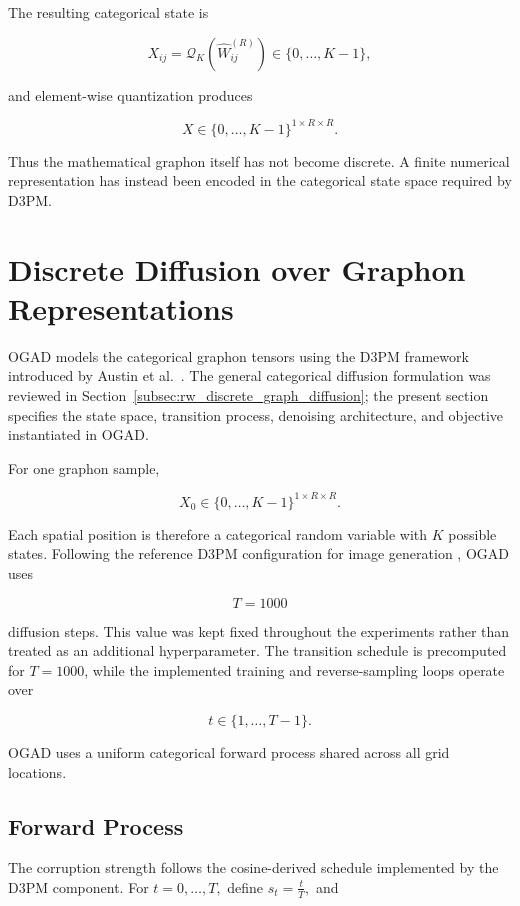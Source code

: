The resulting categorical state is

\[
X_{ij}
=
\mathcal{Q}_K
\left(
\widehat{W}^{(R)}_{ij}
\right)
\in
\{0,\ldots,K-1\},
\]

and element-wise quantization produces

\[
X
\in
\{0,\ldots,K-1\}^{1\times R\times R}.
\]

Thus the mathematical graphon itself has not become discrete. A finite numerical representation has instead been encoded in the categorical state space required by D3PM.


\section{Discrete Diffusion over Graphon Representations}
\label{sec:method_d3pm}

OGAD models the categorical graphon tensors using the D3PM framework introduced by Austin et al.~\cite{austin2021structured}. The general categorical diffusion formulation was reviewed in Section~\ref{subsec:rw_discrete_graph_diffusion}; the present section specifies the state space, transition process, denoising architecture, and objective instantiated in OGAD.

For one graphon sample,

\[ X_0 \in \{0,\ldots,K-1\}^{1\times R\times R}. \]

Each spatial position is therefore a categorical random variable with \(K\) possible states. Following the reference D3PM configuration for image generation \cite{austin2021structured}, OGAD uses

\[
T=1000
\]

diffusion steps. This value was kept fixed throughout the experiments rather than treated as an additional hyperparameter. The transition schedule is precomputed for \(T=1000\), while the implemented training and reverse-sampling loops operate over

\[
t\in\{1,\ldots,T-1\}.
\]

OGAD uses a uniform categorical forward process shared across all grid locations.

\subsection{Forward Process}
\label{subsec:method_d3pm_forward}

The corruption strength follows the cosine-derived schedule implemented by the D3PM component. For $t=0,\ldots,T,$ define $s_t = \frac{t}{T},$ and

